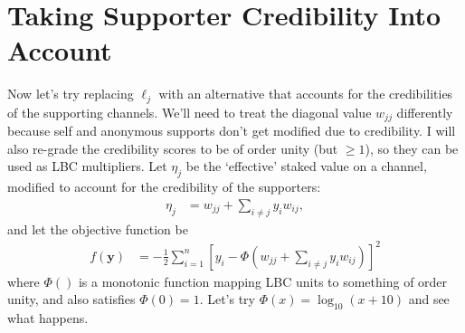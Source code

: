 \documentclass[a4paper, 12pt]{article}
\begin{document}
\section{Taking Supporter Credibility Into Account}
Now let's try replacing $\ell_j$ with an alternative that accounts for the
credibilities of the supporting channels. We'll need to treat the diagonal
value $w_{jj}$ differently because self and anonymous supports don't get
modified due to credibility. I will also re-grade the credibility scores
to be of order unity (but $\geq 1$), so they can be used as LBC multipliers.
Let $\eta_j$ be the `effective' staked value on a channel, modified to account
for the credibility of the supporters:
\begin{align}
\eta_j &= w_{jj} + \sum_{i \neq j} y_i w_{ij},
\end{align}
and let the objective function be
\begin{align}
f(\boldsymbol{y}) &= -\frac{1}{2}\sum_{i=1}^n \left[
                            y_i - \Phi\left(w_{jj} + \sum_{i \neq j} y_i w_{ij}\right)
                        \right]^2
\end{align}
where $\Phi()$ is a monotonic function mapping LBC units to something of order
unity, and also satisfies $\Phi(0) = 1$. Let's try
$\Phi(x) = \log_{10}(x + 10)$ and see what happens.



\end{document}
